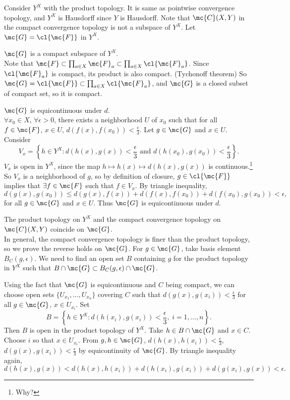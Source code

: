 \pf \note{\mimp} Consider \(Y^X\) with the product topology. It is same as pointwise convergence topology, and \(Y^X\) is Hausdorff since \(Y\) is Hausdorff. Note that \(\mc{C}(X, Y)\) in the compact convergence topology is not a subspace of \(Y^X\). Let \(\mc{G} = \cl{\mc{F}}\) in \(Y^X\).

 \(\mc{G}\) is a compact subspace of \(Y^X\). \\
Note that \(\mc{F} \subset \prod_{a \in X} \mc{F}_a \subset \prod_{a \in X} \cl{\mc{F}_a}\). Since \(\cl{\mc{F}_a}\) is compact, its product is also compact. (Tychonoff theorem) So \(\mc{G} = \cl{\mc{F}} \subset \prod_{a \in X} \cl{\mc{F}_a}\), and \(\mc{G}\) is a closed subset of compact set, so it is compact.

 \(\mc{G}\) is equicontinuous under \(d\).\\
\(\forall x_0 \in X\), \(\forall \epsilon > 0\), there exists a neighborhood \(U\) of \(x_0\) such that for all \(f \in \mc{F}\), \(x \in U\), \(d(f(x), f(x_0)) < \frac{\epsilon}{3}\). Let \(g \in \mc{G}\) and \(x \in U\). Consider
\[
    V_x = \left\{h \in Y^X : d(h(x), g(x)) < \frac{\epsilon}{3} \text{ and } d(h(x_0), g(x_0)) < \frac{\epsilon}{3}\right\}.
\]
\(V_x\) is open in \(Y^X\), since the map \(h \mapsto h(x) \mapsto d(h(x), g(x))\) is continuous.\footnote{Why?} So \(V_x\) is a neighborhood of \(g\), so by definition of closure, \(g \in \cl{\mc{F}}\) implies that \(\exists f \in \mc{F}\) such that \(f \in V_x\). By triangle inequality,
\[
    d(g(x), g(x_0)) \leq d(g(x), f(x)) + d(f(x), f(x_0)) + d(f(x_0), g(x_0)) < \epsilon,
\]
for all \(g \in \mc{G}\) and \(x \in U\). Thus \(\mc{G}\) is equicontinuous under \(d\).

 The product topology on \(Y^X\) and the compact convergence topology on \(\mc{C}(X, Y)\) coincide on \(\mc{G}\).\\
In general, the compact convergence topology is finer than the product topology, so we prove the reverse holds on \(\mc{G}\). For \(g \in \mc{G}\), take basis element \(B_C(g, \epsilon)\). We need to find an open set \(B\) containing \(g\) for the product topology in \(Y^X\) such that \(B \cap \mc{G} \subset B_C(g, \epsilon) \cap \mc{G}\).

Using the fact that \(\mc{G}\) is equicontinuous and \(C\) being compact, we can choose open sets \(\{U_{x_1}, \dots, U_{x_n}\}\) covering \(C\) such that \(d(g(x), g(x_i)) < \frac{\epsilon}{3}\) for all \(g \in \mc{G}\), \(x \in U_{x_i}\). Set
\[
    B = \left\{h \in Y^X : d(h(x_i), g(x_i)) < \frac{\epsilon}{3},\; i = 1, \dots, n\right\}.
\]
Then \(B\) is open in the product topology of \(Y^X\). Take \(h \in B \cap \mc{G}\) and \(x \in C\). Choose \(i\) so that \(x \in U_{x_i}\). From \(g, h \in \mc{G}\), \(d(h(x), h(x_i)) < \frac{\epsilon}{3}\), \(d(g(x), g(x_i)) < \frac{\epsilon}{3}\) by equicontinuity of \(\mc{G}\). By triangle inequality again,
\[
    d(h(x), g(x)) < d(h(x), h(x_i)) + d(h(x_i), g(x_i)) + d(g(x_i), g(x)) < \epsilon.
\]

